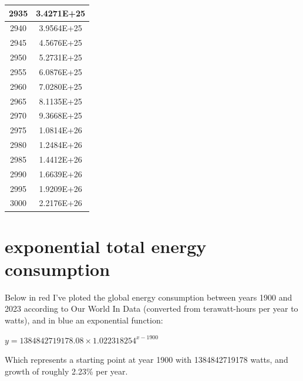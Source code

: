 \documentclass[a4paper]{article}
\begin{document}
\begin{tabular}{|c|c|}
		\hline
		2935 & 3.4271E+25 \\
		\hline
		2940 & 3.9564E+25 \\
		\hline
		2945 & 4.5676E+25 \\
		\hline
		2950 & 5.2731E+25 \\
		\hline
		2955 & 6.0876E+25 \\
		\hline
		2960 & 7.0280E+25 \\
		\hline
		2965 & 8.1135E+25 \\
		\hline
		2970 & 9.3668E+25 \\
		\hline
		2975 & 1.0814E+26 \\
		\hline
		2980 & 1.2484E+26 \\
		\hline
		2985 & 1.4412E+26 \\
		\hline
		2990 & 1.6639E+26 \\
		\hline
		2995 & 1.9209E+26 \\
		\hline
		3000 & 2.2176E+26 \\
		\hline
	\end{tabular}
	
	\normalsize
	
	\pagebreak
	
	\section{exponential total energy consumption}
	
	Below in red I've ploted the global energy consumption between years 1900 and 2023 according to Our World In Data (converted from terawatt-hours per year to watts), and in blue an exponential function:
	
	\begin{center}
		{\large $ y = 1384842719178.08 \times 1.022318254^{x-1900} $}
	\end{center}
	
	\noindent Which represents a starting point at year 1900 with 1384842719178 watts, and growth of roughly 2.23\% per year.
	
	\medskip
	
\end{document}
